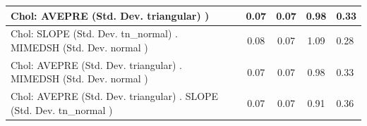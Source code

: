 \begin{table}
\begin{center}
\begin{tabular}{|l|l|c|c|c|l|}
			\hline
			 Chol: AVEPRE (Std. Dev. triangular) ) &  & 0.07 & 0.07 & 0.98 & 0.33 \\
			\hline
			 Chol: SLOPE (Std. Dev. tn_normal) . MIMEDSH (Std. Dev.   normal ) &  & 0.08 & 0.07 & 1.09 & 0.28 \\
			\hline
			 Chol: AVEPRE (Std. Dev. triangular) . MIMEDSH (Std. Dev.   normal ) &  & 0.07 & 0.07 & 0.98 & 0.33 \\
			\hline
			 Chol: AVEPRE (Std. Dev. triangular) . SLOPE (Std. Dev.   tn_normal ) &  & 0.07 & 0.07 & 0.91 & 0.36 \\
			\hline
		\end{tabular}
	\end{center}
\end{table}